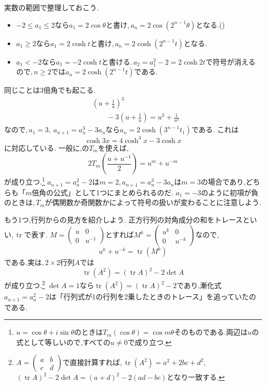 実数の範囲で整理しておこう.
\begin{itemize}
  \item $-2\le a_1\le2$なら$a_1=2\cos\theta$と書け,\,$a_n=2\cos(2^{n-1}\theta)$となる.()
  \item $a_1\ge2$なら$a_1=2\cosh t$と書け,\,$a_n=2\cosh(2^{n-1}t)$となる.
  \item $a_1<-2$なら$a_1=-2\cosh t$と書ける.\,$a_2=a_1^2-2=2\cosh2t$で符号が消えるので,\,$n\ge2$では$a_n=2\cosh(2^{n-1}t)$である.
\end{itemize}

同じことは3倍角でも起こる.
\begin{align*}
  &\left(u+\frac1u\right)^3\\
  &\qquad-3\left(u+\frac1u\right)=u^3+\frac{1}{u^3}
\end{align*}
なので,\,$a_1=3,\ a_{n+1}=a_n^3-3a_n$なら$a_n=2\cosh(3^{n-1}t_1)$である.
これは
\[
  \cosh3x=4\cosh^3x-3\cosh x
\]
に対応している.
一般に,の$T_m$を使えば,
\[
  2T_m\left(\frac{u+u^{-1}}{2}\right)=u^m+u^{-m}
\]
が成り立つ.\footnote{$u=\cos\theta+i\sin\theta$のときは$T_m(\cos\theta)=\cos m\theta$そのものである.両辺は$u$の式として等しいので,すべての$u\ne0$で成り立つ.}
$a_{n+1}=a_n^2-2$は$m=2$,\,$a_{n+1}=a_n^3-3a_n$は$m=3$の場合であり,どちらも「$m$倍角の公式」として1つにまとめられるのだ.
$a_1=-3$のように初項が負のときは,\,$T_m$が偶関数か奇関数かによって符号の扱いが変わることに注意しよう.

もう1つ,行列からの見方を紹介しよう.
正方行列の対角成分の和をトレースといい,\,$\operatorname{tr}$で表す.
$M=\begin{pmatrix}u&0\\0&u^{-1}\end{pmatrix}$とすれば$M^k=\begin{pmatrix}u^k&0\\0&u^{-k}\end{pmatrix}$なので,
\[
  u^k+u^{-k}=\operatorname{tr}(M^k)
\]
である.実は,\,$2\times2$行列$A$では
\[
  \operatorname{tr}(A^2)=(\operatorname{tr}A)^2-2\det A
\]
が成り立つ.\footnote{$A=\begin{pmatrix}a&b\\c&d\end{pmatrix}$で直接計算すれば,\,$\operatorname{tr}(A^2)=a^2+2bc+d^2$, $(\operatorname{tr}A)^2-2\det A=(a+d)^2-2(ad-bc)$となり一致する.}
$\det A=1$なら$\operatorname{tr}(A^2)=(\operatorname{tr}A)^2-2$であり,漸化式$a_{n+1}=a_n^2-2$は「行列式が1の行列を2乗したときのトレース」を追っていたのである.

